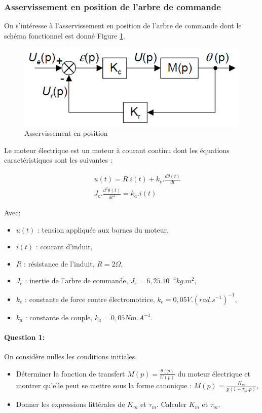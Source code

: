 \subsubsection{Asservissement en position de l'arbre de commande}

On s'intéresse à l'asservissement en position de l'arbre de commande dont le schéma fonctionnel est donné Figure \ref{fig22}.

\newpage

\begin{figure}[!h]
\centering\includegraphics[width=0.5\linewidth]{img/Tracteur22.png}
\caption{Asservissement en position}
\label{fig22}
\end{figure}

Le moteur électrique est un moteur à courant continu dont les équations caractéristiques sont les suivantes :

\begin{eqnarray}
& & u(t)=R.i(t)+k_e.\frac{d\theta(t)}{dt} \nonumber \\
& & J_e.\frac{d^2\theta(t)}{dt^2}=k_a.i(t) \nonumber
\end{eqnarray}

Avec:
\begin{itemize}
 \item $u(t)$ : tension appliquée aux bornes du moteur,
 \item $i(t)$ : courant d'induit,
 \item $R$ : résistance de l'induit, $R=2\Omega$,
 \item $J_e$ : inertie de l'arbre de commande, $J_e=6,25.10^{-4}kg.m^2$,
 \item $k_e$ : constante de force contre électromotrice, $k_e=0,05V.(rad.s^{-1})^{-1}$,
 \item $k_a$ : constante de couple, $k_a=0,05Nm.A^{-1}$.
\end{itemize}

\paragraph{Question 1:} On considère nulles les conditions initiales.

\begin{itemize}
 \item Déterminer la fonction de transfert $M(p)=\frac{\theta(p)}{U(p)}$ du moteur électrique et montrer qu'elle peut se mettre sous la forme canonique : $M(p)=\frac{K_m}{p(1+\tau_m.p)}$,
 \item Donner les expressions littérales de $K_m$ et $\tau_m$. Calculer $K_m$ et $\tau_m$.
\end{itemize}

